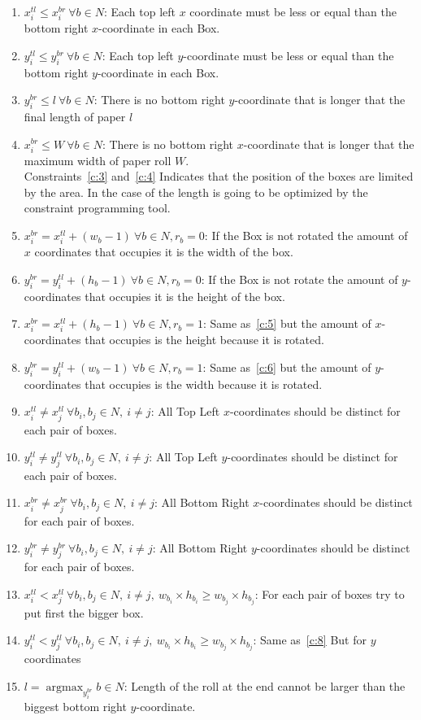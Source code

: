 \documentclass[12pt, a4paper]{article}
\DeclareMathOperator*{\argmax}{argmax} %
\begin{document}
\begin{enumerate}
  \item $x_i^{tl} \leq x_i^{br}\ \forall b \in N$: Each top left $x$ coordinate must be less or equal than the bottom right $x$-coordinate in each Box.
  \item $y_i^{tl} \leq y_i^{br}\ \forall b \in N$: Each top left $y$-coordinate must be less or equal than the bottom right $y$-coordinate in each Box.
  \item\label{c:3} $y_i^{br} \leq l\ \forall b \in N$: There is no bottom right $y$-coordinate that is longer that the final length of paper $l$
  \item\label{c:4} $x_i^{br} \leq W\ \forall b \in N$: There is no bottom right $x$-coordinate that is longer that the maximum width of paper roll $W$.\\
  Constraints~\ref{c:3} and~\ref{c:4} Indicates that the position of the boxes are limited by the area. In the case of the length is going to be optimized by the constraint programming tool.
\item\label{c:5} $x_i^{br} = x_i^{tl} + (w_b - 1)\ \forall b \in N, r_b = 0$: If the Box is not rotated the amount of $x$ coordinates that occupies it is the width of the box.
\item\label{c:6} $y_i^{br} = y_i^{tl} + (h_b - 1)\ \forall b \in N, r_b = 0$: If the Box is not rotate the amount of $y$-coordinates that occupies it is the height of the box.
\item $x_i^{br} = x_i^{tl} + (h_b - 1)\ \forall b \in N, r_b = 1$: Same as~\ref{c:5} but the amount of $x$-coordinates that occupies is the height because it is rotated.
  \item $y_i^{br} = y_i^{tl} + (w_b - 1)\ \forall b \in N, r_b = 1$: Same as~\ref{c:6} but the amount of $y$-coordinates that occupies is the width because it is rotated.
  \item $x_i^{tl} \neq x_j^{tl}\ \forall b_i,b_j \in N,\ i \neq j$: All Top Left $x$-coordinates should be distinct for each pair of boxes.
  \item $y_i^{tl} \neq y_j^{tl}\ \forall b_i,b_j \in N,\ i \neq j$: All Top Left $y$-coordinates should be distinct for each pair of boxes.
  \item $x_i^{br} \neq x_j^{br}\ \forall b_i,b_j \in N,\ i \neq j$: All Bottom Right $x$-coordinates should be distinct for each pair of boxes.
  \item $y_i^{br} \neq y_j^{br}\ \forall b_i,b_j \in N,\ i \neq j$: All Bottom Right $y$-coordinates should be distinct for each pair of boxes.
  \item\label{c:8} $x_i^{tl} < x_j^{tl}\ \forall b_i, b_j \in N,\ i \neq j,\ w_{b_i} \times h_{b_i} \geq w_{b_j} \times h_{b_j}$: For each pair of boxes try to put first the bigger box.
  \item $y_i^{tl} < y_j^{tl}\ \forall b_i, b_j \in N,\ i \neq j,\ w_{b_i} \times h_{b_i} \geq w_{b_j} \times h_{b_j}$: Same as~\ref{c:8} But for $y$ coordinates
  \item $l = \argmax_{y_i^{br}} {b \in N}$: Length of the roll at the end cannot be larger than the biggest bottom right $y$-coordinate.
\end{enumerate}
\end{document}
